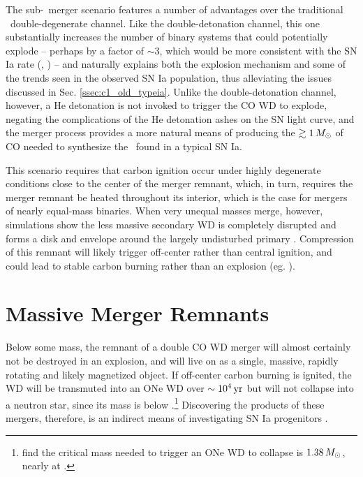 The sub-\Mch\ merger scenario features a number of advantages over the traditional \Mch\ double-degenerate channel.  Like the double-detonation channel, this one substantially increases the number of binary systems that could potentially explode -- perhaps by a factor of $\sim3$, which would be more consistent with the SN Ia rate (\citeal{vkercj10}, \citealt{badem12}) -- and naturally explains both the explosion mechanism and some of the trends seen in the observed SN Ia population, thus alleviating the issues discussed in Sec. \ref{ssec:c1_old_typeia}.  Unlike the double-detonation channel, however, a He detonation is not invoked to trigger the CO WD to explode, negating the complications of the He detonation ashes on the SN light curve, and the merger process provides a more natural means of producing the $\gtrsim1\,\Msun$ of CO needed to synthesize the \Ni\ found in a typical SN Ia.

This scenario requires that carbon ignition occur under highly degenerate conditions close to the center of the merger remnant, which, in turn, requires the merger remnant be heated throughout its interior, which is the case for mergers of nearly equal-mass binaries.  When very unequal masses merge, however, simulations show the less massive secondary WD is completely disrupted and forms a disk and envelope around the largely undisturbed primary \citep{loreig09}.  Compression of this remnant will likely trigger off-center rather than central ignition, and could lead to stable carbon burning rather than an explosion (eg. \citealt{yoonpr07, shen+12}).

\section{Massive Merger Remnants}
\label{sec:c1_hotdqs}

Below some mass, the remnant of a double CO WD merger will almost certainly not be destroyed in an explosion, and will live on as a single, massive, rapidly rotating and likely magnetized object.  If off-center carbon burning is ignited, the WD will be transmuted into an ONe WD over $\sim10^4\,\mathrm{yr}$ \citep{nomoi85, shen+12} but will not collapse into a neutron star, since its mass is below \Mch.\footnote{\cite{schwqb15} find the critical mass needed to trigger an ONe WD to collapse is $1.38\,\Msun$, nearly at \Mch.}  Discovering the products of these mergers, therefore, is an indirect means of investigating SN Ia progenitors \citep{dunlc15}.


